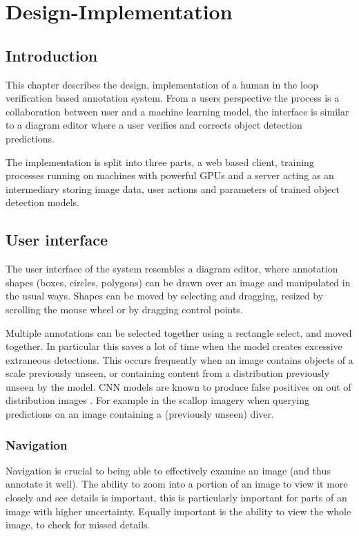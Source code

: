 \chapter{Design-Implementation}
\label{chap:design} 

\section{Introduction}

This chapter describes the design, implementation of a human in the loop verification based annotation system. From a users perspective the process is a collaboration between user and a machine learning model, the interface is similar to a diagram editor where a user verifies and corrects object detection predictions.


The implementation is split into three parts, a web based client, training processes running on machines with powerful \gls{GPU}s and a server acting as an intermediary storing image data, user actions and parameters of trained object detection models.


\section {User interface}

The user interface of the system resembles a diagram editor, where annotation shapes (boxes, circles, polygons) can be drawn over an image and manipulated in the usual ways. Shapes can be moved by selecting and dragging, resized by scrolling the mouse wheel or by dragging control points. 

Multiple annotations can be selected together using a rectangle select, and moved together. In particular this saves a lot of time when the model creates excessive extraneous detections. This occurs frequently when an image contains objects of a scale previously unseen, or containing content from a distribution previously unseen by the model. \gls{CNN} models are known to produce false positives on out of distribution images \cite{todo}. For example in the scallop imagery when querying predictions on an image containing a (previously unseen) diver.

\subsection {Navigation}

Navigation is crucial to being able to effectively examine an image (and thus annotate it well). The ability to zoom into a portion of an image to view it more closely and see details is important, this is particularly important for parts of an image with higher uncertainty. Equally important is the ability to view the whole image, to check for missed details. 

